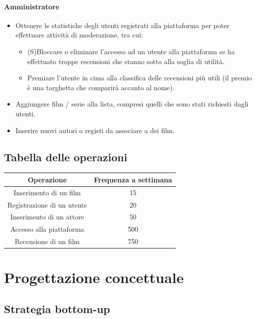 \documentclass[a4paper,12pt]{report}
\begin{document}
	\subsubsection{Amministratore}
	\begin{itemize}
		\item Ottenere le statistiche degli utenti registrati alla piattaforma per poter effettuare attività di moderazione, tra cui: 
		\begin{itemize}
			\item (S)Bloccare o eliminare l'accesso ad un utente alla piattaforma se ha effettuato troppe recensioni che stanno sotto alla soglia di utilità.
			\item Premiare l'utente in cima alla classifica delle recensioni più utili (il premio è una targhetta che comparirà accanto al nome).
		\end{itemize}
		\item Aggiungere film / serie alla lista, compresi quelli che sono stati richiesti dagli utenti.
		\item Inserire nuovi autori o registi da associare a dei film.
	\end{itemize}
	\section{Tabella delle operazioni}
	\begin{table}[H]
		\begin{tabular}{|c|c|}
			\hline
			\rowcolor[HTML]{FFCE93} 
			\textbf{Operazione}        & \textbf{Frequenza a settimana} \\ \hline
			Inserimento di un film     & 15                             \\ \hline
			Registrazione di un utente & 20                             \\ \hline
			Inserimento di un attore   & 50                             \\ \hline
			Accesso alla piattaforma   & 500                            \\ \hline
			Recensione di un film      & 750                            \\ \hline
		\end{tabular}
	\end{table}
	\chapter{Progettazione concettuale}
	\section{Strategia bottom-up}
\end{document}
